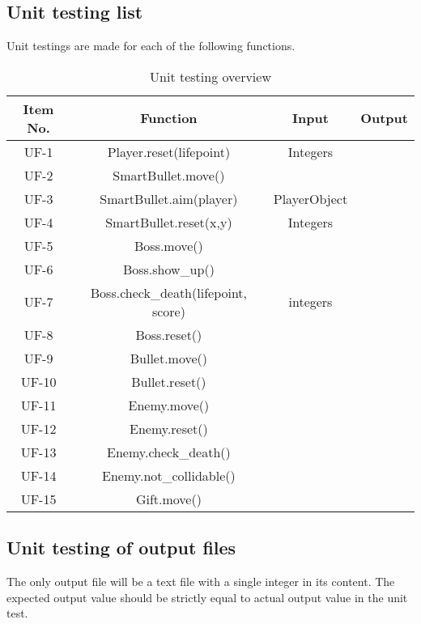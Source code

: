 \documentclass[12pt, titlepage]{article}
\begin{document}
{\color{red}\subsection{Unit testing list}}
{\color{red}Unit testings are made for each of the following functions.}
\newpage
\begin{table}[h!]
{\color{red}\caption{Unit testing overview}}
\begin{center}
{\color{red}\begin{tabular}{|c|c|c|c|}
\hline
Item No. & Function & Input & Output\\
\hline
UF-1 &  Player.reset(lifepoint) & Integers & \\
\hline
UF-2 & SmartBullet.move() &  & \\
\hline
UF-3 & SmartBullet.aim(player) & PlayerObject  & \\
\hline
UF-4 & SmartBullet.reset(x,y) & Integers & \\
\hline
UF-5 & Boss.move() &  & \\
\hline
UF-6 & Boss.show\_up() &  & \\
\hline
UF-7 & Boss.check\_death(lifepoint, score)  & integers &  \\
\hline
UF-8 & Boss.reset() &  &\\
\hline
UF-9 &  Bullet.move() & & \\
\hline
UF-10 & Bullet.reset() &  & \\
\hline
UF-11 & Enemy.move() &  & \\
\hline
UF-12 & Enemy.reset() &  & \\
\hline
UF-13 & Enemy.check\_death() &  & \\
\hline
UF-14 & Enemy.not\_collidable() &  & \\
\hline
UF-15 & Gift.move() &  &\\
\hline
\end{tabular}}
\end{center}
\label{default}
\end{table}
		
\subsection{Unit testing of output files}	
The only output file will be a text file with a single integer in its content. The expected output value should be strictly equal to actual output value in the unit test.	


\newpage
\end{document}
